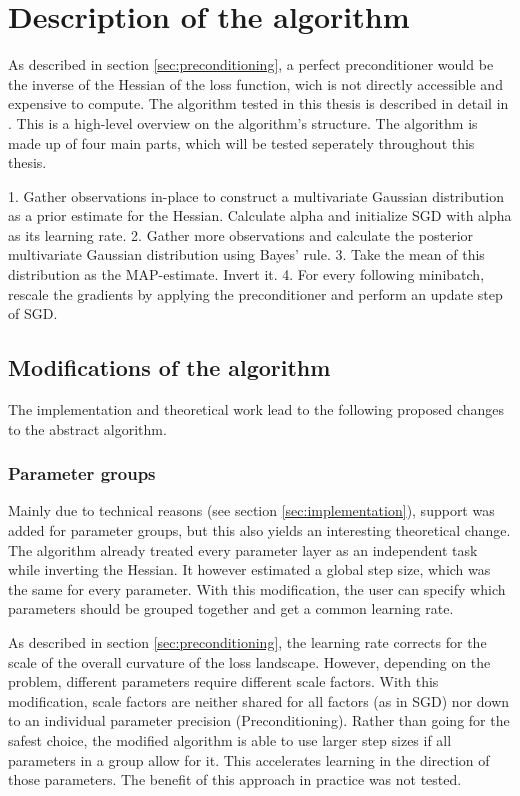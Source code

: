 \documentclass[twoside,12pt,a4paper]{report}
\begin{document}
\section{Description of the algorithm}
As described in section \ref{sec:preconditioning}, a perfect preconditioner would be the inverse of the Hessian of the loss function, wich is not directly accessible and expensive to compute.
The algorithm tested in this thesis is described in detail in \cite{roos2019active}.
This is a high-level overview on the algorithm's structure.
The algorithm is made up of four main parts, which will be tested seperately throughout this thesis.
\begin{markdown}
1. Gather observations in-place to construct a multivariate Gaussian distribution as a prior estimate for the Hessian. Calculate alpha and initialize SGD with alpha as its learning rate.
2. Gather more observations and calculate the posterior multivariate Gaussian distribution using Bayes' rule.
3. Take the mean of this distribution as the MAP-estimate. Invert it.
4. For every following minibatch, rescale the gradients by applying the preconditioner and perform an update step of SGD.
\end{markdown}


\subsection{Modifications of the algorithm}
The implementation and theoretical work lead to the following proposed changes to the abstract algorithm.

\subsubsection{Parameter groups}
Mainly due to technical reasons (see section \ref{sec:implementation}), support was added for parameter groups, but this also yields an interesting theoretical change. The algorithm already treated every parameter layer as an independent task while inverting the Hessian. It however estimated a global step size, which was the same for every parameter. With this modification, the user can specify which parameters should be grouped together and get a common learning rate.

As described in section \ref{sec:preconditioning}, the learning rate corrects for the scale of the overall curvature of the loss landscape. However, depending on the problem, different parameters require different scale factors. With this modification, scale factors are neither shared for all factors (as in SGD) nor down to an individual parameter precision (Preconditioning).
Rather than going for the safest choice, the modified algorithm is able to use larger step sizes if all parameters in a group allow for it. This accelerates learning in the direction of those parameters. The benefit of this approach in practice was not tested.
\end{document}
